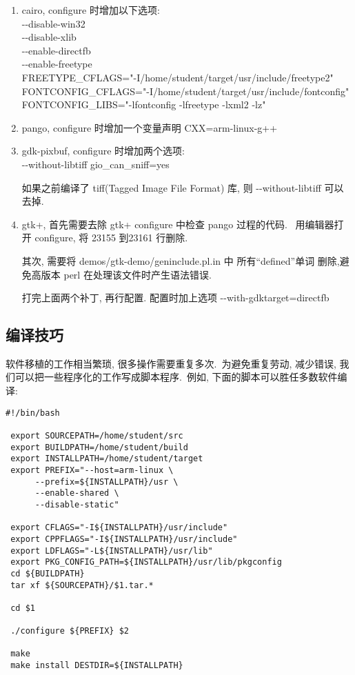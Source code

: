 \begin{enumerate}
  \item cairo,  configure 时增加以下选项:\\
      -{}-disable-win32 \\
      -{}-disable-xlib \\
      -{}-enable-directfb \\
      -{}-enable-freetype \\
      FREETYPE\_CFLAGS="-I/home/student/target/usr/include/freetype2" \\
      FONTCONFIG\_CFLAGS="-I/home/student/target/usr/include/fontconfig" \\
      FONTCONFIG\_LIBS="-lfontconfig -lfreetype -lxml2 -lz"

  \item pango, configure 时增加一个变量声明 CXX=arm-linux-g++

  \item gdk-pixbuf, configure 时增加两个选项:\\
      -{}-without-libtiff gio\_can\_sniff=yes

      如果之前编译了 tiff(Tagged Image File Format) 库, 则 -{}-without-libtiff 
      可以去掉.

  \item gtk+, 首先需要去除 gtk+ configure 中检查 pango 过程的代码.
      ~用编辑器打开 configure, 将 23155 到23161 行删除.

     其次, 需要将 demos/gtk-demo/geninclude.pl.in 中 所有``defined''单词
     删除,避免高版本 perl 在处理该文件时产生语法错误.

     打完上面两个补丁, 再行配置. 配置时加上选项 -{}-with-gdktarget=directfb \\

\end{enumerate}

\subsection{编译技巧}
    软件移植的工作相当繁琐, 很多操作需要重复多次.~为避免重复劳动, 减少错误,
我们可以把一些程序化的工作写成脚本程序.~例如, 下面的脚本可以胜任多数软件编译:

\lstset{extendedchars=false}
\lstset{numbers=none} 
\lstset{frameround=fttt}
         
\begin{lstlisting}[frame=trBL]
 #!/bin/bash

 export SOURCEPATH=/home/student/src
 export BUILDPATH=/home/student/build
 export INSTALLPATH=/home/student/target
 export PREFIX="--host=arm-linux \
 　　　--prefix=${INSTALLPATH}/usr \
 　　　--enable-shared \
 　　　--disable-static"

 export CFLAGS="-I${INSTALLPATH}/usr/include"
 export CPPFLAGS="-I${INSTALLPATH}/usr/include"
 export LDFLAGS="-L${INSTALLPATH}/usr/lib"
 export PKG_CONFIG_PATH=${INSTALLPATH}/usr/lib/pkgconfig
 cd ${BUILDPATH}
 tar xf ${SOURCEPATH}/$1.tar.*

 cd $1

 ./configure ${PREFIX} $2

 make
 make install DESTDIR=${INSTALLPATH}
\end{lstlisting}

